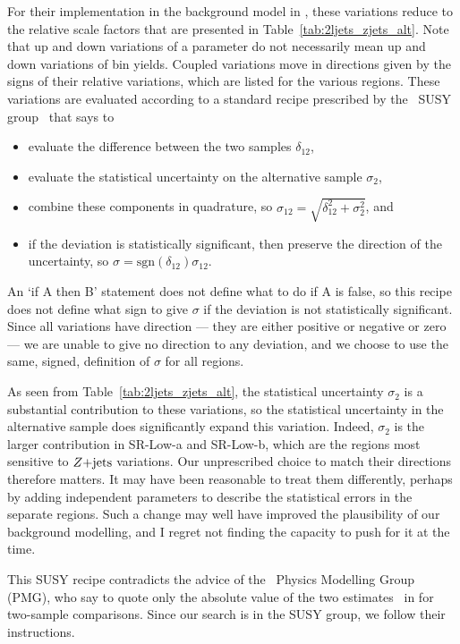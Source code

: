 For their implementation in the background model in \histfactory, these
variations reduce to the relative scale factors that are presented in
Table~\ref{tab:2ljets_zjets_alt}.
Note that up and down variations of a parameter do not
necessarily mean up and down variations of bin yields.
Coupled variations move in directions given by the signs of their relative
variations, which are listed for the various regions.
These variations are evaluated according to a standard recipe prescribed by
the \atlas\ SUSY group~\cite{atlas_twiki_susytheoretical} that says to
\begin{itemize}
\item evaluate the difference between the two samples $\delta_{12}$,
\item evaluate the statistical uncertainty on the alternative sample
$\sigma_2$,
\item combine these components in quadrature, so
$\sigma_{12} = \sqrt{\delta_{12}^2 + \sigma_2^2}$, and
\item if the deviation is statistically significant, then preserve the direction
of the uncertainty, so $\sigma = \mathrm{sgn}(\delta_{12})\sigma_{12}$.
\end{itemize}
An `if A then B' statement does not define what to do if A is false, so
this recipe does not define what sign to give $\sigma$ if the deviation is not
statistically significant.
Since all variations have direction
--- they are either positive or negative or zero ---
we are unable to give no direction to any deviation, and we choose to
use the same, signed, definition of $\sigma$ for all regions.

As seen from Table~\ref{tab:2ljets_zjets_alt}, the statistical uncertainty
$\sigma_2$ is a substantial contribution to these variations, so
the statistical uncertainty in the alternative sample does significantly
expand this variation.
Indeed, $\sigma_2$ is the larger contribution in SR-Low-a and SR-Low-b, which
are the regions most sensitive to $Z\mathrm{+jets}$ variations.
Our unprescribed choice to match their directions therefore matters.
It may have been reasonable to treat them differently, perhaps by adding
independent parameters to describe the statistical errors in the separate
regions.
Such a change may well have improved the plausibility of our background
modelling, and I regret not finding the capacity to push for it at the time.

This SUSY recipe contradicts the advice of the \atlas\ Physics Modelling Group
(PMG), who say to quote only the absolute value of the two
estimates~\cite{atlas_twiki_pmg_theory} in for two-sample
comparisons.
Since our search is in the SUSY group, we follow their instructions.

